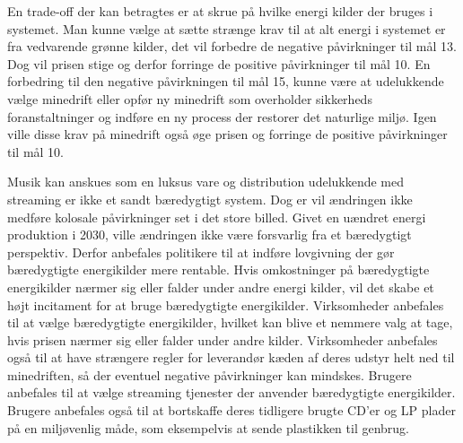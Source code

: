 En trade-off der kan betragtes er at skrue på hvilke energi kilder der bruges i systemet.
Man kunne vælge at sætte strænge krav til at alt energi i systemet er fra vedvarende grønne kilder, det vil forbedre de negative påvirkninger til mål 13.
Dog vil prisen stige og derfor forringe de positive påvirkninger til mål 10. 
En forbedring til den negative påvirkningen til mål 15, kunne være at udelukkende vælge minedrift eller opfør ny minedrift som overholder sikkerheds foranstaltninger og indføre en ny process der restorer det naturlige miljø.
Igen ville disse krav på minedrift også øge prisen og forringe de positive påvirkninger til mål 10.

Musik kan anskues som en luksus vare og distribution udelukkende med streaming er ikke et sandt bæredygtigt system. 
Dog er vil ændringen ikke medføre kolosale påvirkninger set i det store billed. Givet en uændret energi produktion i 2030, ville ændringen ikke være forsvarlig fra et bæredygtigt perspektiv.
Derfor anbefales politikere til at indføre lovgivning der gør bæredygtigte energikilder mere rentable. 
Hvis omkostninger på bæredygtigte energikilder nærmer sig eller falder under andre energi kilder, vil det skabe et højt incitament for at bruge bæredygtigte energikilder.
Virksomheder anbefales til at vælge bæredygtigte energikilder, hvilket kan blive et nemmere valg at tage, hvis prisen nærmer sig eller falder under andre kilder. 
Virksomheder anbefales også til at have strængere regler for leverandør kæden af deres udstyr helt ned til minedriften, så der eventuel negative påvirkninger kan mindskes.
Brugere anbefales til at vælge streaming tjenester der anvender bæredygtigte energikilder. 
Brugere anbefales også til at bortskaffe deres tidligere brugte CD'er og LP plader på en miljøvenlig måde, som eksempelvis at sende plastikken til genbrug.
